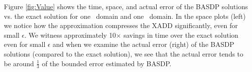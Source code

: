 Figure \ref{fig:Value} shows the time, space, and actual error of the
BASDP solutions vs. the exact solution for one \MarsRoverBi\ domain and one 
\Invent\ domain.  In the space plots (left) we notice how the
approximation compresses the XADD significantly, even for small
$\epsilon$.  We witness approximately 10$\times$ savings in time over
the exact solution even for small $\epsilon$ and when we examine the
actual error (right) of the BASDP solutions (compared to the exact
solution), we see that the actual error tends to be around
$\frac{1}{3}$ of the bounded error estimated by BASDP.

